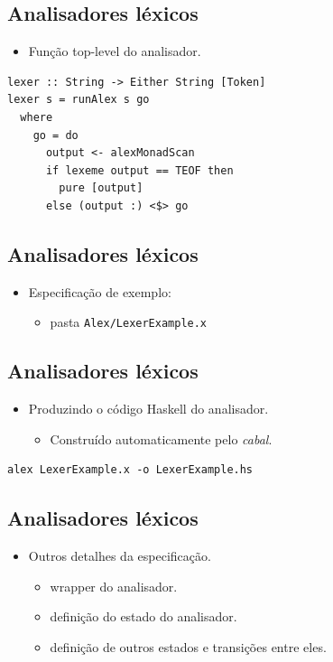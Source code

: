 \documentclass[11pt]{article}
\begin{document}
\subsection*{Analisadores léxicos}
\label{sec:org394ee46}

\begin{itemize}
\item Função top-level do analisador.
\end{itemize}

\begin{verbatim}
lexer :: String -> Either String [Token]
lexer s = runAlex s go
  where
    go = do
      output <- alexMonadScan
      if lexeme output == TEOF then
        pure [output]
      else (output :) <$> go
\end{verbatim}
\subsection*{Analisadores léxicos}
\label{sec:org0acf3eb}

\begin{itemize}
\item Especificação de exemplo:
\begin{itemize}
\item pasta \texttt{Alex/LexerExample.x}
\end{itemize}
\end{itemize}
\subsection*{Analisadores léxicos}
\label{sec:org946cf78}

\begin{itemize}
\item Produzindo o código Haskell do analisador.
\begin{itemize}
\item Construído automaticamente pelo \emph{cabal}.
\end{itemize}
\end{itemize}

\begin{verbatim}
alex LexerExample.x -o LexerExample.hs
\end{verbatim}
\subsection*{Analisadores léxicos}
\label{sec:orge121c30}

\begin{itemize}
\item Outros detalhes da especificação.
\begin{itemize}
\item wrapper do analisador.
\item definição do estado do analisador.
\item definição de outros estados e transições entre eles.
\end{itemize}
\end{itemize}
\end{document}
